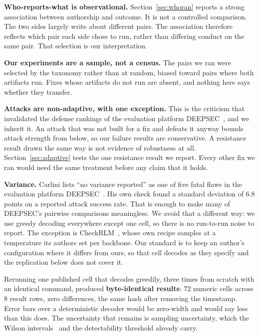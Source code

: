 \textbf{Who-reports-what is observational.} Section~\ref{sec:whoran} reports a
strong association between authorship and outcome. It is not a controlled
comparison. The two sides largely write about different pairs. The
association therefore reflects which pair each side chose to run, rather than
differing conduct on the same pair. That selection is our interpretation.

\textbf{Our experiments are a sample, not a census.} The pairs we ran were
selected by the taxonomy rather than at random, biased toward pairs where
both artifacts run. Fixes whose artifacts do not run are
absent, and nothing here says whether they transfer.

\textbf{Attacks are non-adaptive, with one exception.} This is the criticism
that invalidated the defense rankings of the evaluation platform
DEEPSEC~\cite{carlini-2019-critique}, and
we inherit it. An attack that was not built for a fix and defeats it
anyway bounds attack strength from below, so our failure results are
conservative. A resistance result drawn the same way is not evidence of
robustness at all.
Section~\ref{sec:adaptive} tests the one resistance result we report. Every
other fix we ran would need the same treatment before any claim
that it holds.

\textbf{Variance.} Carlini lists ``no variance
reported'' as one of five fatal flaws in the evaluation platform DEEPSEC~\cite{carlini-2019-critique}.
His own check found a standard deviation of 6.8 points on a reported attack
success rate. That is enough to make many of DEEPSEC's pairwise comparisons
meaningless. We avoid that a
different way: we use greedy decoding everywhere except one cell, so there is
no run-to-run noise to report. The exception is
CheckRLM~\cite{xu-2026-checkrlm}, whose own recipe samples at a temperature
its authors set per backbone. Our standard is to keep an author's
configuration where it differs from ours, so that cell decodes as they
specify and the replication below does not cover it.

Rerunning one published cell that decodes greedily, three
times from scratch with an identical command, produced \textbf{byte-identical
results}: 72 numeric cells across 8 result rows, zero differences, the same
hash after removing the timestamp. Error bars over a deterministic decoder
would be zero-width and would say less than this does. The uncertainty that
remains is sampling uncertainty, which the Wilson intervals~\cite{wilson-1927-probable} and the
detectability threshold already carry.

